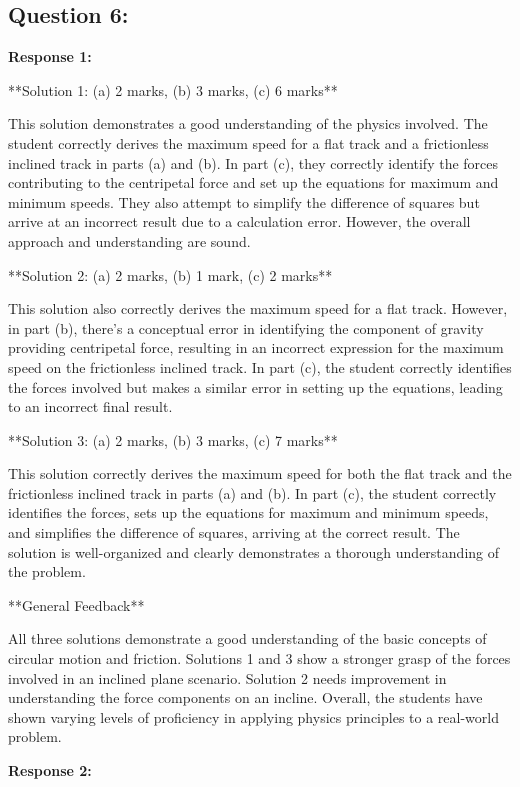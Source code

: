 \documentclass[a4paper,11pt]{article}
\begin{document}
\subsection*{Question 6:}

\textbf{Response 1:}

**Solution 1: (a) 2 marks, (b) 3 marks, (c) 6 marks**

This solution demonstrates a good understanding of the physics involved. The student correctly derives the maximum speed for a flat track and a frictionless inclined track in parts (a) and (b). In part (c), they correctly identify the forces contributing to the centripetal force and set up the equations for maximum and minimum speeds. They also attempt to simplify the difference of squares but arrive at an incorrect result due to a calculation error. However, the overall approach and understanding are sound.

**Solution 2: (a) 2 marks, (b) 1 mark, (c) 2 marks**

This solution also correctly derives the maximum speed for a flat track. However, in part (b), there's a conceptual error in identifying the component of gravity providing centripetal force, resulting in an incorrect expression for the maximum speed on the frictionless inclined track. In part (c), the student correctly identifies the forces involved but makes a similar error in setting up the equations, leading to an incorrect final result.

**Solution 3: (a) 2 marks, (b) 3 marks, (c) 7 marks**

This solution correctly derives the maximum speed for both the flat track and the frictionless inclined track in parts (a) and (b). In part (c), the student correctly identifies the forces, sets up the equations for maximum and minimum speeds, and simplifies the difference of squares, arriving at the correct result. The solution is well-organized and clearly demonstrates a thorough understanding of the problem.

**General Feedback**

All three solutions demonstrate a good understanding of the basic concepts of circular motion and friction. Solutions 1 and 3 show a stronger grasp of the forces involved in an inclined plane scenario. Solution 2 needs improvement in understanding the force components on an incline. Overall, the students have shown varying levels of proficiency in applying physics principles to a real-world problem.

\bigskip    
\textbf{Response 2:}
\end{document}
